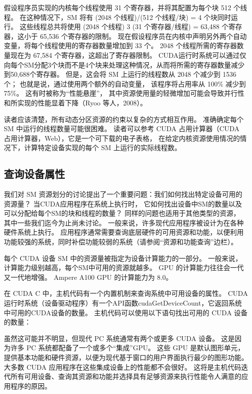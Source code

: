 假设程序员实现的内核每个线程使用 31 个寄存器，并将其配置为每个块 512 个线程。 
在这种情况下，SM 将有 (2048 个线程)/(512 个线程/块) = 4 个块同时运行。 
这些线程总共将使用 (2048 个线程) 3 (31 个寄存器/线程) = 63,488 个寄存器，这小于 65,536 个寄存器的限制。 
现在假设程序员在内核中声明另外两个自动变量，将每个线程使用的寄存器数量增加到 33 个。
2048 个线程所需的寄存器数量现在为 67,584 个寄存器，这超出了寄存器限制。
 CUDA运行时系统可以通过仅向每个SM分配3个块而不是4个块来处理这种情况，从而将所需的寄存器数量减少到50,688个寄存器。 
 但是，这会将 SM 上运行的线程数从 2048 个减少到 1536 个； 也就是说，通过使用两个额外的自动变量，
 该程序将占用率从 100\% 减少到 75\%。 这有时被称为“性能悬崖”，
 其中资源使用量的轻微增加可能会导致并行性和所实现的性能显着下降（Ryoo 等人，2008）。

读者应该清楚，所有动态分区资源的约束以复杂的方式相互作用。 准确确定每个 SM 中运行的线程数量可能很困难。 
读者可以参考 CUDA 占用计算器（CUDA 占用计算器，Web），它是一个可下载的电子表格，
在给定内核资源使用情况的情况下，计算特定设备实现的每个 SM 上运行的实际线程数。

\subsection{查询设备属性}
我们对 SM 资源划分的讨论提出了一个重要问题：我们如何找出特定设备可用的资源量？ 当CUDA应用程序在系统上执行时，
它如何找出设备中SM的数量以及可以分配给每个SM的块和线程的数量？ 同样的问题也适用于其他类型的资源，
其中一些我们迄今为止尚未讨论。 一般来说，许多现代应用程序被设计为在各种硬件系统上执行。 
应用程序通常需要查询底层硬件的可用资源和功能，以便利用功能较强的系统，同时补偿功能较弱的系统（请参阅“资源和功能查询”边栏）。

每个 CUDA 设备 SM 中的资源量被指定为设备计算能力的一部分。 一般来说，计算能力级别越高，每个SM中可用的资源就越多。 
GPU 的计算能力往往会一代又一代地增强。 Ampere A100 GPU 的计算能力为 8.0。

在 CUDA C 中，主机代码有一个内置机制来查询系统中可用设备的属性。 
CUDA运行时系统（设备驱动程序）有一个API函数cudaGetDeviceCount，它返回系统中可用的CUDA设备的数量。 
主机代码可以使用以下语句找出可用的 CUDA 设备的数量：

虽然这可能并不明显，但现代 PC 系统通常有两个或更多 CUDA 设备。 这是因为许多 PC 系统都配备了一个或多个“集成”GPU。 
这些 GPU 是默认图形单元，提供基本功能和硬件资源，以便为现代基于窗口的用户界面执行最少的图形功能。 
大多数 CUDA 应用程序在这些集成设备上的性能都不会很好。 
这将是主机代码迭代所有可用设备、查询其资源和功能并选择具有足够资源来执行性能令人满意的应用程序的原因。

